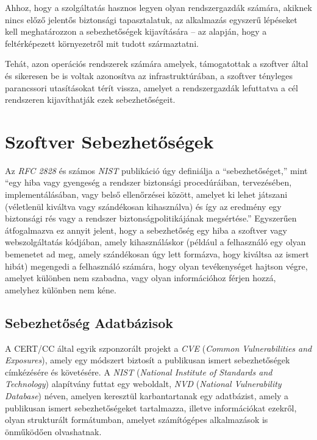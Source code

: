	Ahhoz, hogy a szolgáltatás hasznos legyen olyan rendszergazdák számára, akiknek nincs előző jelentős biztonsági tapasztalatuk, az alkalmazás egyszerű lépéseket kell meghatározzon a sebezhetőségek kijavítására -- az alapján, hogy a feltérképezett környezetről mit tudott származtatni.

	Tehát, azon operációs rendszerek számára amelyek, támogatottak a szoftver által és sikeresen be is voltak azonosítva az infrastruktúrában, a szoftver tényleges parancssori utasításokat térít vissza, amelyet a rendszergazdák lefuttatva a cél rendszeren kijavíthatják ezek sebezhetőségeit.
	
\section*{Szoftver Sebezhetőségek}
	
	Az \textit{RFC 2828} és számos \textit{NIST} publikáció úgy definiálja a ``sebezhetőséget,'' mint ``egy hiba vagy gyengeség a rendszer biztonsági procedúráiban, tervezésében, implementálásában, vagy belső ellenőrzései között, amelyet ki lehet játszani (véletlenül kiváltva vagy szándékosan kihasználva) és így az eredmény egy biztonsági rés vagy a rendszer biztonságpolitikájának megsértése.''\cite{rfc2828,nist80030} Egyszerűen átfogalmazva ez annyit jelent, hogy a sebezhetőség egy hiba a szoftver vagy webszolgáltatás kódjában, amely kihasználáskor (például a felhasználó egy olyan bemenetet ad meg, amely szándékosan úgy lett formázva, hogy kiváltsa az ismert hibát) megengedi a felhasználó számára, hogy olyan tevékenységet hajtson végre, amelyet különben nem szabadna, vagy olyan információhoz férjen hozzá, amelyhez különben nem kéne.
	
\subsection*{Sebezhetőség Adatbázisok}
	
	A CERT/CC által egyik szponzorált projekt a \textit{CVE} (\textit{Common Vulnerabilities and Exposures}), amely egy módszert biztosít a publikusan ismert sebezhetőségek címkézésére és követésére. A \textit{NIST} (\textit{National Institute of Standards and Technology}) alapítvány futtat egy weboldalt, \textit{NVD} (\textit{National Vulnerability Database}) néven, amelyen keresztül karbantartanak egy adatbázist, amely a publikusan ismert sebezhetőségeket tartalmazza, illetve információkat ezekről, olyan strukturált formátumban, amelyet számítógépes alkalmazások is önműködően olvashatnak\cite{nvd15}.
	
